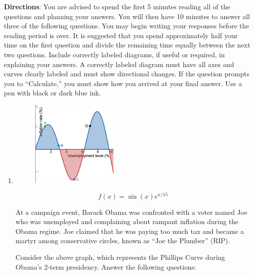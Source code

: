\noindent\textbf{Directions}: You are advised to spend the first 5 minutes
reading all of the questions and planning your answers. You will then
have 10 minutes to answer all three of the following questions. You may
begin writing your responses before the reading period is over. It is
suggested that you spend approximately half your time on the first
question and divide the remaining time equally between the next two
questions. Include correctly labeled diagrams, if useful or required, in
explaining your answers. A correctly labeled diagram must have all axes
and curves clearly labeled and must show directional changes. If the
question prompts you to “Calculate,” you must show how you arrived at
your final answer. Use a pen with black or dark blue ink. \\

\clearpage
\begin{enumerate}[itemsep=0.5cm]
  \item
        \begin{figure}[h]
          \centering
          \includegraphics[width=0.4\textwidth]{assets/phillips.png}
        \end{figure}

        \[
          f\left(x\right)=\sin\left(x\right)e^{x/15}
        \]

        At a campaign event, Barack Obama was confronted with a voter
        named Joe who was unemployed and complaining about rampant
        inflation during the Obama regime. Joe claimed that he was
        paying too much tax and became a martyr among conservative
        circles, known as ``Joe the Plumber'' (RIP). \\
        \medskip

        Consider the above graph, which represents the Phillips Curve
        during Obama's 2-term presidency. Answer the following questions:\@

        \bigskip

        \begin{adjustwidth}{0.3in}{0.3in}
          \begin{enumerate}[itemsep=0.5cm]


\end{enumerate}
\end{adjustwidth}
\end{enumerate}
